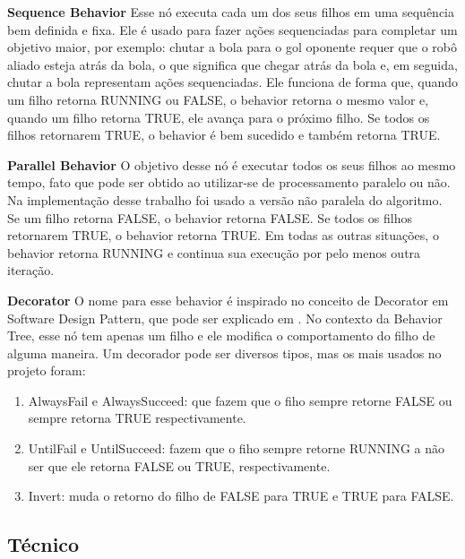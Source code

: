 \documentclass[10pt,fleqn,a4paper]{article}
\begin{document}
\textbf{Sequence Behavior} Esse nó executa cada um dos seus filhos em uma sequência bem definida e fixa. Ele é usado para fazer ações sequenciadas para completar um objetivo maior, por exemplo: chutar a bola para o gol oponente requer que o robô aliado esteja atrás da bola, o que significa que chegar atrás da bola e, em seguida, chutar a bola representam ações sequenciadas. Ele funciona de forma que, quando um filho retorna RUNNING ou FALSE, o behavior retorna o mesmo valor e, quando um filho retorna TRUE, ele avança para o próximo filho. Se todos os filhos retornarem TRUE, o behavior é bem sucedido e também retorna TRUE.

\textbf{Parallel Behavior} O objetivo desse nó é executar todos os seus filhos ao mesmo tempo, fato que pode ser obtido ao utilizar-se de processamento paralelo ou não. Na implementação desse trabalho foi usado a versão não paralela do algoritmo. Se um filho retorna FALSE, o behavior retorna FALSE. Se todos os filhos retornarem TRUE, o behavior retorna TRUE. Em todas as outras situações, o behavior retorna RUNNING e continua sua execução por pelo menos outra iteração.

\textbf{Decorator} O nome para esse behavior é inspirado no conceito de Decorator em Software Design Pattern, que pode ser explicado em \cite{hunt2013gang}. No contexto da Behavior Tree, esse nó tem apenas um filho e ele modifica o comportamento do filho de alguma maneira. Um decorador pode ser diversos tipos, mas os mais usados no projeto foram:

\begin{enumerate}
\item AlwaysFail e AlwaysSucceed: que fazem que o fiho sempre retorne FALSE ou sempre retorna TRUE respectivamente.
\item UntilFail e UntilSucceed: fazem que o fiho sempre retorne RUNNING a não ser que ele retorna FALSE ou TRUE, respectivamente.
\item Invert: muda o retorno do filho de FALSE para TRUE e TRUE para FALSE.
\end{enumerate}

\subsection{Técnico}
\end{document}

